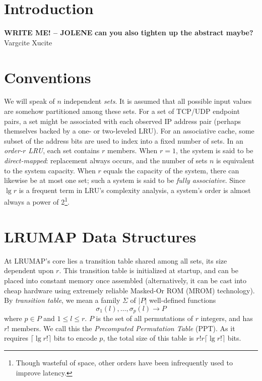 \documentclass[10pt]{sigplanconf}
\begin{document}
\section{Introduction}
\textbf{WRITE ME! -- JOLENE}
\textbf{can you also tighten up the abstract maybe?}
Vargcite\citep{varghese}
Xucite\citep{xu}

\section{Conventions}
We will speak of $n$ independent \textit{sets}. It is assumed that all possible
input values are somehow partitioned among these sets. For a set of TCP/UDP
endpoint pairs, a set might be associated with each observed IP address pair
(perhaps themselves backed by a one- or two-leveled LRU). For an associative
cache, some subset of the address bits are used to index into a fixed number of
sets. In an \textit{order-$r$ LRU}, each set contains $r$ members. When $r=1$,
the system is said to be \textit{direct-mapped}: replacement always occurs, and
the number of sets $n$ is equivalent to the system capacity. When $r$ equals
the capacity of the system, there can likewise be at most one set; such a system
is said to be \textit{fully associative}. Since $\lg{r}$ is a frequent term in
LRU's complexity analysis, a system's order is almost always a power of 2\footnote{Though
wasteful of space, other orders have been infrequently used to improve latency\citep{intelcpuid}.}.
\section{LRUMAP Data Structures}
At LRUMAP's core lies a transition table shared among all sets, its size
dependent upon $r$. This transition table is initialized at startup, and can be
placed into constant memory once assembled (alternatively, it can be cast into
cheap hardware using extremely reliable Masked-Or ROM (MROM)
technology\citep{ice}). By \textit{transition table}, we mean a family $\Sigma$ of $|P|$
well-defined functions \begin{equation*}
\sigma_{1}(l),\dotsc,\sigma_{p}(l)\longrightarrow{P}
\end{equation*} where $p\in{P}$ and $1\le{l}\le{r}$. $P$ is the set of all
permutations of $r$ integers, and has $r!$ members. We call this the \textit{Precomputed
Permutation Table} (PPT). As it requires $\lceil\lg{r!}\rceil$
bits to encode $p$, the total size of this table is $r!r\lceil\lg{r!}\rceil$ bits.
\end{document}
